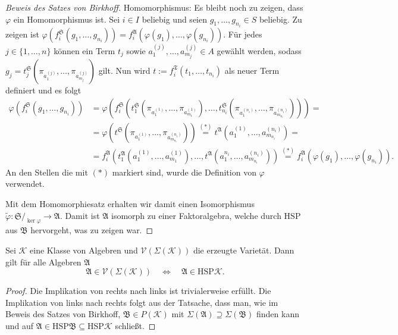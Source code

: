 \begin{proof}[Beweis des Satzes von Birkhoff]
    Homomorphismus: Es bleibt noch zu zeigen, dass $\varphi$ ein Homomorphismus ist.
    Sei $i\in I$ beliebig und seien $g_1,\ldots,g_{n_i}\in S$ beliebig. Zu zeigen ist $\varphi(f^\mathfrak{S}_i(g_1,\ldots,g_{n_i}))=f^\mathfrak{A}_i(\varphi(g_1),\ldots,\varphi(g_{n_i}))$.
    Für jedes $j\in \{1,\ldots,n\}$ können ein Term $t_j$ sowie $a_1^{(j)},\ldots,a_{m_j}^{(j)}\in A$ gewählt werden,
    sodass $g_j=t^\mathfrak{S}_j(\pi_{a_1^{(j)}},\ldots,\pi_{a_{m_j}^{(j)}})$ gilt. Nun wird $t:=f^\mathfrak{T}_i(t_1,\ldots,t_{n_i})$ als neuer Term definiert und es folgt
    \begin{align*}
        \varphi(f^\mathfrak{S}_i(g_1,\ldots,g_{n_i}))&=\varphi(f^\mathfrak{S}_i(t^\mathfrak{S}_1(\pi_{a_1^{(1)}},\ldots,\pi_{a_{m_1}^{(1)}}),\ldots,t^\mathfrak{S}_{n_i}(\pi_{a_1^{(n_i)}},\ldots,\pi_{a_{m_{n_i}}^{(n_i)}})))=\\
        &=\varphi(t^\mathfrak{S}(\pi_{a_1^{(1)}},\ldots,\pi_{a_{m_{n_i}}^{(n_i)}}))\stackrel{(*)}{=}t^\mathfrak{A}(a_1^{(1)},\ldots,a_{m_{n_i}}^{(n_i)})=\\
        &=f^\mathfrak{A}_i(t^\mathfrak{A}_1(a_1^{(1)},\ldots,a_{m_1}^{(1)}),\ldots,t^\mathfrak{A}(a_1^{n_i},\ldots,a_{m_{n_i}}^{(n_i)}))\stackrel{(*)}{=}f^\mathfrak{A}_i(\varphi(g_1),\ldots,\varphi(g_{n_i})).
    \end{align*}
    An den Stellen die mit $(*)$ markiert sind, wurde die Definition von $\varphi$ verwendet.

    Mit dem Homomorphiesatz erhalten wir damit einen Isomorphismus $\tilde{\varphi} : \mathfrak{S} /_{\ker \varphi} \to \mathfrak{A}$. Damit ist $\mathfrak{A}$ isomorph zu einer Faktoralgebra, welche durch $\mathrm{HSP}$ aus $\mathfrak{B}$ hervorgeht, was zu zeigen war.
\end{proof}

\begin{corollary}
    Sei $\mathcal{K}$ eine Klasse von Algebren und $\mathcal{V}(\Sigma(\mathcal{K}))$ die erzeugte Varietät. Dann gilt für alle Algebren $\mathfrak{A}$
    $$ \mathfrak{A} \in \mathcal{V}(\Sigma(\mathcal{K})) \quad \Leftrightarrow \quad \mathfrak{A} \in \mathrm{HSP}\mathcal{K}. $$
\end{corollary}

\begin{proof}
    Die Implikation von rechts nach links ist trivialerweise erfüllt. Die Implikation von links nach rechts folgt aus der Tatsache, dass man, wie im Beweis des Satzes von Birkhoff, $\mathfrak{B}\in P(\mathcal{K})$ mit $\Sigma(\mathfrak{A})\supseteq\Sigma(\mathfrak{B})$ finden kann und auf $\mathfrak{A}\in \mathrm{HSP}\mathfrak{B}\subseteq \mathrm{HSP}\mathcal{K}$ schließt.
\end{proof}